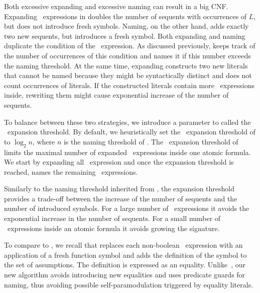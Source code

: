 Both excessive expanding and excessive naming can result in a big CNF. Expanding \ITE\ expressions in \nfcnf{} doubles the number of sequents with occurrences of $L$, but does not introduce fresh symbols. Naming, on the other hand, adds exactly two new sequents, but introduces a fresh symbol. Both expanding and naming duplicate the condition of the \ITE\ expression. As discussed previously, \nfcnf{} keeps track of the number of occurrences of this condition and names it if this number exceeds the naming threshold. At the same time, expanding constructs two new literals that cannot be named because they might be syntactically distinct and \nfcnf{} does not count occurrences of literals. If the constructed literals contain more \ITE\ expressions inside, rewriting them might cause exponential increase of the number of sequents.

To balance between these two strategies, we introduce a parameter to \nfcnf{} called the \ITE\ expansion threshold.
By default, we heuristically set the \ITE\ expansion threshold of \nfcnf{} to $\log_2 n$, where $n$ is the naming threshold of \newcnf{}. The \ITE\ expansion threshold of \nfcnf{} limits the maximal number of expanded \ITE\ expressions inside one atomic formula. We start by expanding all \ITE\ expression and once the expansion threshold is reached, \nfcnf{} names the remaining \ITE\ expressions.

Similarly to the naming threshold inherited from \newcnf{},
the expansion threshold 
provides a trade-off between the increase of the number of sequents and the number of introduced symbols. For a large number of \ITE\ expressions it avoids the exponential increase in the number of sequents. For a small number of \ITE\ expressions inside an atomic formula it avoids growing the signature.


To compare to \oldcnf{}, we recall that \oldcnf{} replaces each non-boolean \ITE\ expression with an application of a fresh function symbol and adds the definition of the symbol to the set of assumptions. The definition is expressed as an equality. 
Unlike~\oldcnf{}, our new \nfcnf{} algorithm avoids introducing new equalities and uses predicate guards for naming, thus avoiding possible self-paramodulation triggered by equality literals. %

